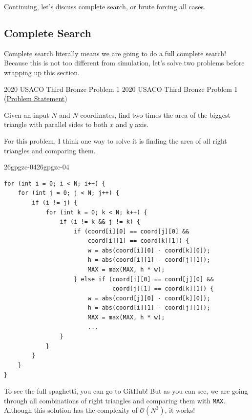 \documentclass[../../../main.tex]{subfiles}
\begin{document}
Continuing, let's discuss complete search, or brute forcing all cases.

\subsection{Complete Search}

Complete search literally means we are going to do a full complete
search! Because this is not too different from simulation, let's solve
two problems before wrapping up this section.

\begin{problem}
{2020 USACO Third Bronze Problem 1}
{2020 USACO Third Bronze Problem 1}
(\href{https://usaco.org/index.php?page=viewproblem2&cpid=1011}{Problem Statement})

Given an input $N$ and $N$ coordinates, find two times the area of
the biggest triangle with parallel sides to both $x$ and $y$ axis.
\end{problem}
\begin{solution}
For this problem, I think one way to solve it is finding the area of
all right triangles and comparing them.

\begin{cppboxSolution}{26gpgzc-04}{26gpgzc-04}
\begin{lstlisting}[style=cppstyle]
for (int i = 0; i < N; i++) {
    for (int j = 0; j < N; j++) {
        if (i != j) {
            for (int k = 0; k < N; k++) {
                if (i != k && j != k) {
                    if (coord[i][0] == coord[j][0] &&
                        coord[i][1] == coord[k][1]) {
                        w = abs(coord[i][0] - coord[k][0]);
                        h = abs(coord[i][1] - coord[j][1]);
                        MAX = max(MAX, h * w);
                    } else if (coord[i][0] == coord[j][0] &&
                               coord[j][1] == coord[k][1]) {
                        w = abs(coord[j][0] - coord[k][0]);
                        h = abs(coord[i][1] - coord[j][1]);
                        MAX = max(MAX, h * w);
                        ...
                }
            }
        }
    }
}
\end{lstlisting}
\end{cppboxSolution}

To see the full spaghetti, you can go to GitHub! But as you can
see, we are going through all combinations of right triangles and
comparing them with \verb|MAX|. Although this solution has the
complexity of $\mathcal{O}(N^3)$, it works!
\end{solution}
\end{document}
